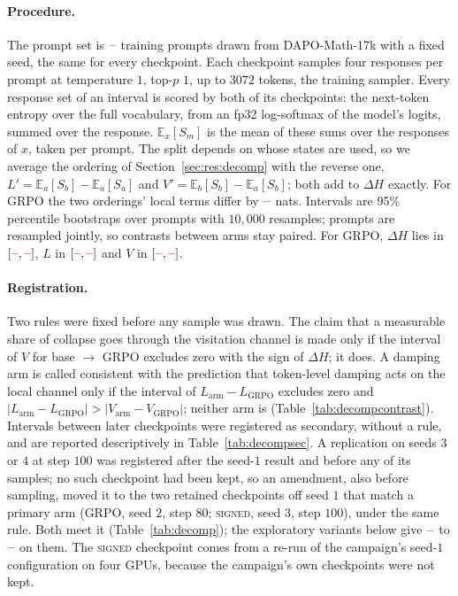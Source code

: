 \documentclass[11pt]{article}
\providecommand{\PENDING}{\textcolor{red}{\textbf{--}}}
\newcommand{\num}[1]{\ifcsname #1\endcsname\csname #1\endcsname\else\PENDING\fi}
\begin{document}
\paragraph{Procedure.} The prompt set is $\num{DecNprompts}$ training prompts drawn
from DAPO-Math-17k with a fixed seed, the same for every checkpoint. Each checkpoint
samples four responses per prompt at temperature $1$, top-$p$ $1$, up to $3072$
tokens, the training sampler. Every response set of an interval is scored by both of
its checkpoints: the next-token entropy over the full vocabulary, from an fp32
log-softmax of the model's logits, summed over the response. $\mathbb{E}_x[S_m]$ is
the mean of these sums over the responses of $x$, taken per prompt. The split depends
on whose states are used, so we average the ordering of
Section~\ref{sec:res:decomp} with the reverse one,
$L' = \mathbb{E}_a[S_b] - \mathbb{E}_a[S_a]$ and
$V' = \mathbb{E}_b[S_b] - \mathbb{E}_a[S_b]$; both add to $\Delta H$ exactly. For GRPO
the two orderings' local terms differ by $\num{DecGrpoLgap}$ nats. Intervals are 95\%
percentile bootstraps over prompts with $10{,}000$ resamples; prompts are resampled
jointly, so contrasts between arms stay paired. For GRPO, $\Delta H$ lies in
$[\num{DecGrpoDHLo}, \num{DecGrpoDHHi}]$, $L$ in $[\num{DecGrpoLLo},
\num{DecGrpoLHi}]$ and $V$ in $[\num{DecGrpoVLo}, \num{DecGrpoVHi}]$.

\paragraph{Registration.} Two rules were fixed before any sample was drawn. The claim
that a measurable share of collapse goes through the visitation channel is made only
if the interval of $V$ for base $\to$ GRPO excludes zero with the sign of $\Delta H$;
it does. A damping arm is called consistent with the prediction that token-level
damping acts on the local channel only if the interval of $L_{\text{arm}} -
L_{\text{GRPO}}$ excludes zero and $|L_{\text{arm}} - L_{\text{GRPO}}| >
|V_{\text{arm}} - V_{\text{GRPO}}|$; neither arm is (Table~\ref{tab:decompcontrast}).
Intervals between later checkpoints were registered as secondary, without a rule, and
are reported descriptively in Table~\ref{tab:decompsec}. A replication on seeds $3$
or $4$ at step $100$ was registered after the seed-$1$ result and before any of its
samples; no such checkpoint had been kept, so an amendment, also before sampling,
moved it to the two retained checkpoints off seed $1$ that match a primary arm (GRPO,
seed $2$, step $80$; \textsc{signed}, seed $3$, step $100$), under the same rule. Both
meet it (Table~\ref{tab:decomp}); the exploratory variants below give
$\num{DecRepRobustMin}$ to $\num{DecRepRobustMax}$ on them. The
\textsc{signed} checkpoint comes from a re-run of the campaign's seed-$1$
configuration on four GPUs, because the campaign's own checkpoints were not kept.
\end{document}
